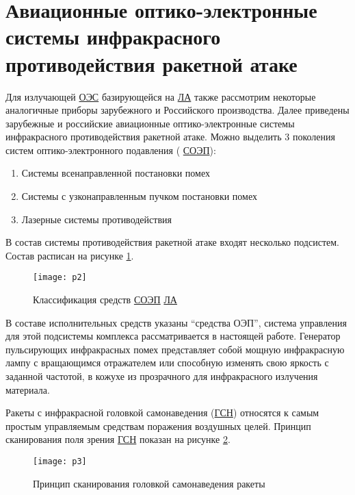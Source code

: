 \section{Авиационные оптико-электронные системы инфракрасного противодействия ракетной атаке} \label{sec:ch1/sec2-}

Для излучающей  \hyperref[acroEOS]{ОЭС} базирующейся на  \hyperref[acroLA]{ЛА} также рассмотрим некоторые аналогичные приборы зарубежного и Российского производства. Далее приведены зарубежные и российские авиационные оптико-электронные системы инфракрасного противодействия ракетной атаке. Можно выделить 3 поколения систем оптико-электронного подавления ( \hyperref[acroSOEP]{СОЭП}):

\begin{enumerate}
	\item Системы всенаправленной постановки помех
	\item Системы с узконаправленным пучком постановки помех
	\item Лазерные системы противодействия 	
\end{enumerate}

В состав системы противодействия ракетной атаке входят несколько подсистем. Состав расписан на рисунке \ref{fig:classification}.

\begin{figure}[ht]
	\centering
	\texttt{[image: p2]} 
	\caption{Классификация средств  \hyperref[acroSOEP]{СОЭП}  \hyperref[acroLA]{ЛА} \cite[]{ForeignMilitary}}
	\label{fig:classification}
\end{figure}

В составе исполнительных средств указаны “средства ОЭП”, система управления для этой подсистемы комплекса рассматривается в настоящей работе. Генератор пульсирующих инфракрасных помех представляет собой мощную инфракрасную лампу с вращающимся отражателем или способную изменять свою яркость с заданной частотой, в кожухе из прозрачного для инфракрасного излучения материала.

Ракеты с инфракрасной головкой самонаведения (\hyperref[acroGSN]{ГСН}) относятся к самым простым управляемым средствам поражения воздушных целей. Принцип сканирования поля зрения \hyperref[acroGSN]{ГСН} показан на рисунке \ref{fig:rocketScanning}. 

\begin{figure}[ht]
	\centering
	\texttt{[image: p3]} 
	\caption{Принцип сканирования головкой самонаведения ракеты}
	\label{fig:rocketScanning}
\end{figure}

